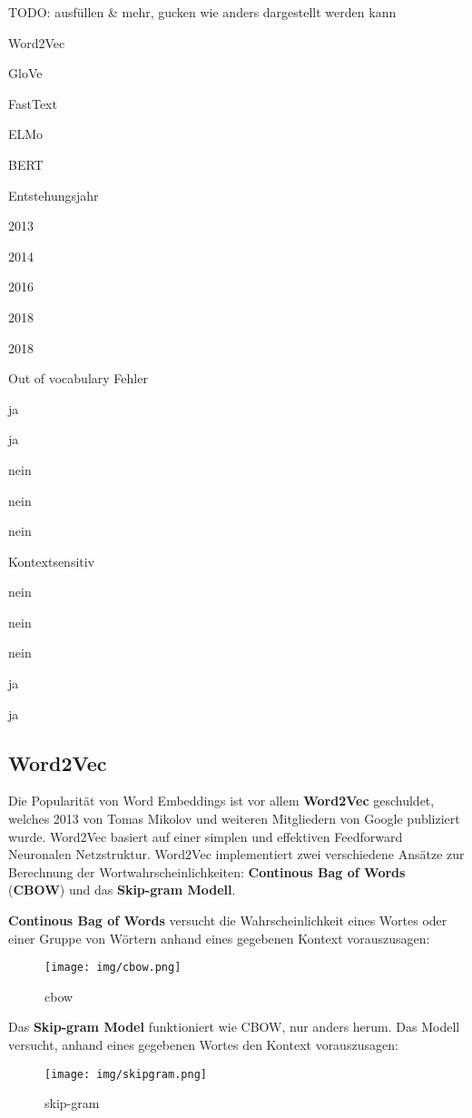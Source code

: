 \documentclass[11pt]{article}
\begin{document}
    TODO: ausfüllen \& mehr, gucken wie anders dargestellt werden kann

Word2Vec

GloVe

FastText

ELMo

BERT

Entstehungsjahr

2013

2014

2016

2018

2018

Out of vocabulary Fehler

ja

ja

nein

nein

nein

Kontextsensitiv

nein

nein

nein

ja

ja

    \hypertarget{word2vec}{%
\subsection{Word2Vec}\label{word2vec}}

Die Popularität von Word Embeddings ist vor allem \textbf{Word2Vec}
geschuldet, welches 2013 von Tomas Mikolov und weiteren Mitgliedern von
Google publiziert wurde. Word2Vec basiert auf einer simplen und
effektiven Feedforward Neuronalen Netzstruktur. Word2Vec implementiert
zwei verschiedene Ansätze zur Berechnung der Wortwahrscheinlichkeiten:
\textbf{Continous Bag of Words} (\textbf{CBOW}) und das
\textbf{Skip-gram Modell}.

\textbf{Continous Bag of Words} versucht die Wahrscheinlichkeit eines
Wortes oder einer Gruppe von Wörtern anhand eines gegebenen Kontext
vorauszusagen:

\begin{figure}
\centering
\texttt{[image: img/cbow.png]}
\caption{cbow}
\end{figure}

Das \textbf{Skip-gram Model} funktioniert wie CBOW, nur anders herum.
Das Modell versucht, anhand eines gegebenen Wortes den Kontext
vorauszusagen:

\begin{figure}
\centering
\texttt{[image: img/skipgram.png]}
\caption{skip-gram}
\end{figure}
\end{document}
